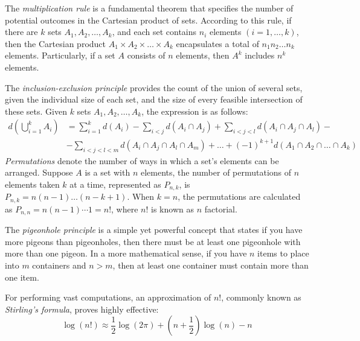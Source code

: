 The \emph{multiplication rule} is a fundamental theorem that specifies the number of potential outcomes in the Cartesian product of sets. According to this rule, if there are $k$ sets $A_1, A_2, \ldots, A_k$, and each set contains $n_i$ elements $\left( i=1, \ldots, k \right)$, then the Cartesian product $A_1 \times A_2 \times \ldots \times A_k$ encapsulates a total of $n_1 n_2 \ldots n_k$ elements. Particularly, if a set $A$ consists of $n$ elements, then $A^k$ includes $n^k$ elements.

The \emph{inclusion-exclusion principle} provides the count of the union of several sets, given the individual size of each set, and the size of every feasible intersection of these sets. Given $k$ sets $A_1, A_2, \ldots, A_k$, the expression is as follows:
\begin{equation*}
\begin{split}
d \left( \bigcup_{i=1}^k A_i \right) & = \sum_{i=1}^k d \left( A_i \right) - \sum_{i<j} d \left( A_i \cap A_j \right) + \sum_{i<j<l} d \left( A_i \cap A_j \cap A_l \right) - \\
& - \sum_{i<j<l<m} d \left( A_i \cap A_j \cap A_l \cap A_m \right) + \ldots +  (-1)^{k+1} d \left( A_1 \cap A_2 \cap \ldots \cap A_k \right) 
\end{split}
\end{equation*}
\emph{Permutations} denote the number of ways in which a set's elements can be arranged. Suppose $A$ is a set with $n$ elements, the number of permutations of $n$ elements taken $k$ at a time, represented as $P_{n,k}$, is $P_{n,k} = n \left( n-1 \right) \ldots \left( n-k+1 \right)$. When $k=n$, the permutations are calculated as $P_{n,n} = n \left( n-1 \right) \cdots 1=n!$, where $n!$ is known as $n$ factorial.

The \emph{pigeonhole principle} is a simple yet powerful concept that states if you have more pigeons than pigeonholes, then there must be at least one pigeonhole with more than one pigeon. In a more mathematical sense, if you have $n$ items to place into $m$ containers and $n>m$, then at least one container must contain more than one item.

For performing vast computations, an approximation of $n!$, commonly known as \emph{Stirling's formula}, proves highly effective:
\[
\log\left(n!\right) \approx \frac{1}{2}\log\left(2\pi\right)+\left(n+\frac{1}{2}\right)\log\left(n\right)-n
\]

